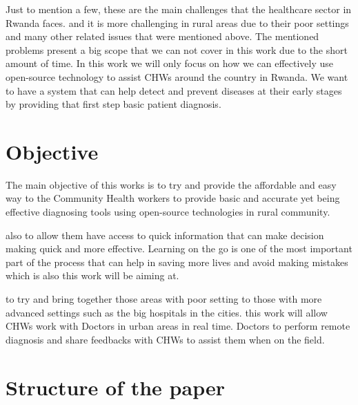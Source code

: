 Just to mention a few, these are the main challenges that the healthcare sector in Rwanda faces. and it is more challenging in rural areas due to their poor settings and many other related issues that were mentioned above. The mentioned problems present a big scope that we can not cover in this work due to the short amount of time. In this work we will only focus on how we can effectively use open-source technology to assist CHWs around the country in Rwanda. We want to have a system that can help detect and prevent diseases at their early stages by providing that first step basic patient diagnosis.

\section{Objective}
The main objective of this works is to try and provide the affordable and easy way to the Community Health workers to provide basic and accurate yet being effective diagnosing tools using open-source technologies in rural community.

also to allow them have access to quick information that can make decision making quick and more effective. Learning on the go is one of the most important part of the process that can help in saving more lives and avoid making mistakes which is also this work will be aiming at.

to try and bring together those areas with poor setting to those with more advanced settings such as the big hospitals in the cities. this work will allow CHWs work with Doctors in urban areas in real time. Doctors to perform remote diagnosis and share feedbacks with CHWs to assist them when on the field.

\section{Structure of the paper}


